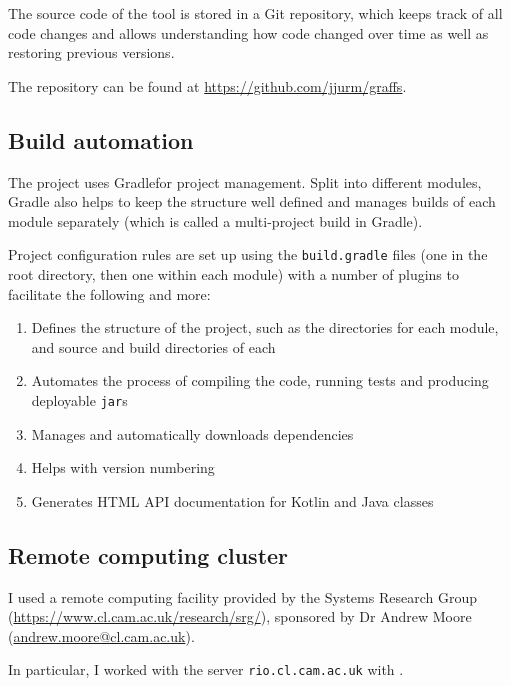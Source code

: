 The source code of the \graffs tool is stored in a Git repository, which keeps track of all code changes and allows understanding how code changed over time as well as restoring previous versions.

The repository can be found at \url{https://github.com/jjurm/graffs}.

\subsection{Build automation}

The project uses Gradle\citeneeded for project management.
Split into different modules, Gradle also helps to keep the structure well defined and manages builds of each module separately (which is called a multi-project build in Gradle).

Project configuration rules are set up using the \texttt{build.gradle} files (one in the root directory, then one within each module) with a number of plugins to facilitate the following and more:
\begin{enumerate}
    \item Defines the structure of the project, such as the directories for each module, and source and build directories of each
    \item Automates the process of compiling the code, running tests and producing deployable \texttt{jar}s
    \item Manages and automatically downloads dependencies
    \item Helps with version numbering
    \item Generates HTML API documentation for Kotlin and Java classes
\end{enumerate}





\subsection{Remote computing cluster}

I used a remote computing facility provided by the Systems Research Group (\url{https://www.cl.cam.ac.uk/research/srg/}), sponsored by Dr Andrew Moore (\url{andrew.moore@cl.cam.ac.uk}).

In particular, I worked with the server \texttt{rio.cl.cam.ac.uk} with .

